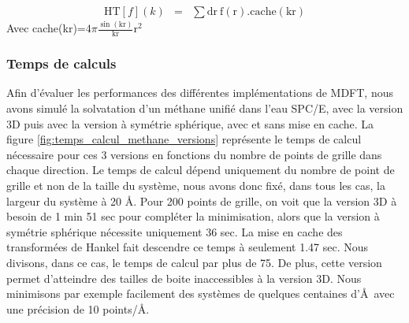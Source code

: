 \begin{eqnarray}
\mathrm{HT}[f](k) &=& \sum \mathrm{dr}\ \mathrm{f}(\mathrm{r}) . \mathrm{cache}(\mathrm{kr})
\end{eqnarray}
Avec cache(kr)=$4\pi\frac{\sin(\mathrm{kr})}{\mathrm{kr}}\mathrm{r}^2$


\subsubsection{Temps de calculs}
Afin d'évaluer les performances des différentes implémentations de MDFT, nous avons simulé la solvatation d'un méthane unifié dans l'eau SPC/E, avec la version 3D puis avec la version à symétrie sphérique, avec et sans mise en cache. La figure \ref{fig:temps_calcul_methane_versions} représente le temps de calcul nécessaire pour ces 3 versions en fonctions du nombre de points de grille dans chaque direction. Le temps de calcul dépend uniquement du nombre de point de grille et non de la taille du système, nous avons donc fixé, dans tous les cas, la largeur du système à 20 \AA. Pour 200 points de grille, on voit que la version 3D à besoin de 1 min 51 sec pour compléter la minimisation, alors que la version à symétrie sphérique nécessite uniquement 36 sec. La mise en cache des transformées de Hankel fait descendre ce temps à seulement 1.47 sec. Nous divisons, dans ce cas, le temps de calcul par plus de 75. De plus, cette version permet d'atteindre des tailles de boite inaccessibles à la version 3D. Nous minimisons par exemple facilement des systèmes de quelques centaines d'\AA\ avec une précision de 10 points/\AA.



